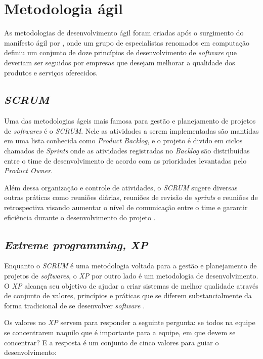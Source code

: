 \documentclass[
12pt,				%
openright,			%
oneside,			%
a4paper,			%
english,			%
french,				%
spanish,			%
brazil,				%
]{abntex2}
\begin{document}
\section{Metodologia ágil}

As metodologias de desenvolvimento ágil foram criadas após o surgimento do manifesto ágil por , onde um grupo de especialistas renomados em computação definiu um conjunto de doze princípios de desenvolvimento de \textit{software} que deveriam ser seguidos por empresas que desejam melhorar a qualidade dos produtos e serviços oferecidos.

\subsection{\textit{SCRUM}}

Uma das metodologias ágeis mais famosa para gestão e planejamento de projetos de \textit{softwares} é o \textit{SCRUM}. Nele as atividades a serem implementadas são mantidas em uma lista conhecida como \textit{Product Backlog}, e o projeto é divido em ciclos chamados de \textit{Sprints} onde as atividades registradas no \textit{Backlog} são distribuídas entre o time de desenvolvimento de acordo com as prioridades levantadas pelo \textit{Product Owner}.

Além dessa organização e controle de atividades, o \textit{SCRUM} sugere diversas outras práticas como reuniões diárias, reuniões de revisão de \textit{sprints} e reuniões de retrospectiva visando aumentar o nível de comunicação entre o time e garantir eficiência durante o desenvolvimento do projeto \cite{Agil:SCRUM}.

\subsection{\textit{Extreme programming, XP}}

Enquanto o \textit{SCRUM} é uma metodologia voltada para a gestão e planejamento de projetos de \textit{softwares}, o \textit{XP} por outro lado é um metodologia de desenvolvimento. O \textit{XP} alcança seu objetivo de ajudar a criar sistemas de melhor qualidade através de conjunto de valores, princípios e práticas que se diferem substancialmente da forma tradicional de se desenvolver \textit{software} \cite{Agil:XP}.

Os valores no \textit{XP} servem para responder a seguinte pergunta: se todos na equipe se concentrarem naquilo que é importante para a equipe, em que devem se concentrar? E a resposta é um conjunto de cinco valores para guiar o desenvolvimento:
\end{document}
